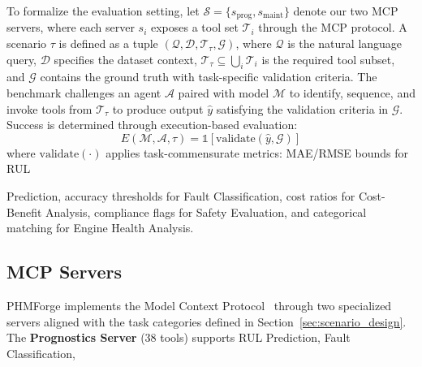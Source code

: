 \documentclass[sigconf]{acmart}
\begin{document}
  To formalize the evaluation setting, let $\mathcal{S} = \{s_{\text{prog}},               
  s_{\text{maint}}\}$                                                                      
  denote our two MCP servers, where each server $s_i$ exposes a tool set $\mathcal{T}_i$   
  through the MCP protocol. A scenario $\tau$ is defined as a tuple $(\mathcal{Q},         
  \mathcal{D},                                                                             
  \mathcal{T}_{\tau}, \mathcal{G})$, where $\mathcal{Q}$ is the natural language query,    
  $\mathcal{D}$ specifies the dataset context, $\mathcal{T}_{\tau} \subseteq \bigcup_i     
  \mathcal{T}_i$ is the required tool subset, and $\mathcal{G}$ contains the ground truth  
  with task-specific validation criteria. The benchmark challenges an agent $\mathcal{A}$  
  paired with model $\mathcal{M}$ to identify, sequence, and invoke tools from             
  $\mathcal{T}_{\tau}$ to produce output $\hat{y}$ satisfying the validation criteria in   
  $\mathcal{G}$. Success is determined through execution-based evaluation:                 
  \begin{equation}                                                                         
      E(\mathcal{M}, \mathcal{A}, \tau) = \mathbb{1}[\text{validate}(\hat{y}, \mathcal{G})]
  \end{equation}                                                                           
  where $\text{validate}(\cdot)$ applies task-commensurate metrics: MAE/RMSE bounds for RUL
                                                                                           
  Prediction, accuracy thresholds for Fault Classification, cost ratios for Cost-Benefit   
  Analysis, compliance flags for Safety Evaluation, and categorical matching for Engine    
  Health Analysis.                                                                         
                                                                                           
  \subsection{MCP Servers}                                                                 
                                                                                           
  PHMForge implements the Model Context Protocol~\cite{mcp2024} through two specialized    
  servers aligned with the task categories defined in Section~\ref{sec:scenario_design}.   
  The \textbf{Prognostics Server} (38 tools) supports RUL Prediction, Fault Classification,
                                                                                           
\end{document}
